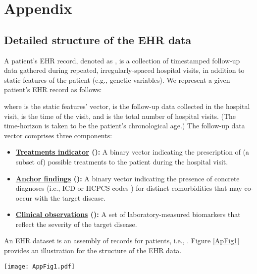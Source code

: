 \documentclass[twoside,11pt]{article}
\begin{document}
\newpage
\section*{Appendix}
\subsection*{Detailed structure of the EHR data}
A patient's EHR record, denoted as \mbox{\footnotesize }, is a collection of timestamped follow-up data gathered during repeated, irregularly-spaced hospital visits, in addition to static features of the patient (e.g., genetic variables). We represent a given patient's EHR record as follows:  
    
where \mbox{\footnotesize } is the static features' vector, \mbox{\footnotesize } is the follow-up data collected in the \mbox{\footnotesize } hospital visit, \mbox{\footnotesize } is the time of the \mbox{\footnotesize } visit, and \mbox{\footnotesize } is the total number of hospital visits. (The time-horizon \mbox{\footnotesize } is taken to be the patient's chronological age.) The follow-up data vector \mbox{\footnotesize } comprises three components:
\begin{itemize}
\item {\bf \underline{Treatments indicator} (\mbox{\footnotesize }):} A binary vector indicating the prescription of (a subset of) \mbox{\footnotesize } possible treatments to the patient during the \mbox{\footnotesize } hospital visit. 
\item {\bf \underline{Anchor findin}g\underline{s} (\mbox{\footnotesize }):} A binary vector indicating the presence of concrete diagnoses (i.e., ICD or HCPCS codes \cite{blumenthal2010meaningful}) for \mbox{\footnotesize } distinct comorbidities that may co-occur with the target disease. 
\item {\bf \underline{Clinical observations} (\mbox{\footnotesize }):} A set of laboratory-measured biomarkers that reflect the severity of the target disease.
\end{itemize}
An EHR dataset \mbox{\footnotesize } is an assembly of records for \mbox{\footnotesize } patients, i.e., \mbox{\footnotesize }. Figure \ref{ApFig1} provides an illustration for the structure of the EHR data.
\begin{figure*}[h]
  \centering
  \texttt{[image: AppFig1.pdf]}
  \caption{\footnotesize Illustration for the structure of the EHR data.} 
	\label{ApFig1}
\end{figure*}
\end{document}
